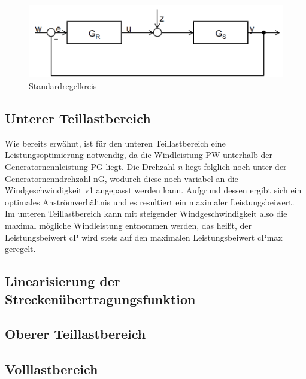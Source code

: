 \begin{figure}[H]
    \centering
    \includegraphics[scale=0.45]{Bilder/Kapitel 6/Standardregelkreis.PNG}
    \caption{Standardregelkreis}
    \label{fig:Standardregelkreis}
\end{figure}
\newpage

\subsection{Unterer Teillastbereich}

Wie bereits erwähnt, ist für den unteren Teillastbereich eine Leistungsoptimierung notwendig, da die Windleistung \acs{PW} unterhalb der Generatornennleistung \acs{PG} liegt. Die Drehzahl \textit{n} liegt folglich noch unter der Generatornenndrehzahl \acs{nG}, wodurch diese noch variabel an die Windgeschwindigkeit \acs{v1} angepasst werden kann. Aufgrund dessen ergibt sich ein optimales Anströmverhältnis und es resultiert ein maximaler Leistungsbeiwert. Im unteren Teillastbereich kann mit steigender Windgeschwindigkeit also die maximal mögliche Windleistung entnommen werden, das heißt, der Leistungsbeiwert \acs{cP} wird stets auf den maximalen Leistungsbeiwert \acs{cPmax} geregelt.


\subsection{Linearisierung der Streckenübertragungsfunktion}

\subsection{Oberer Teillastbereich}
\subsection{Volllastbereich}
